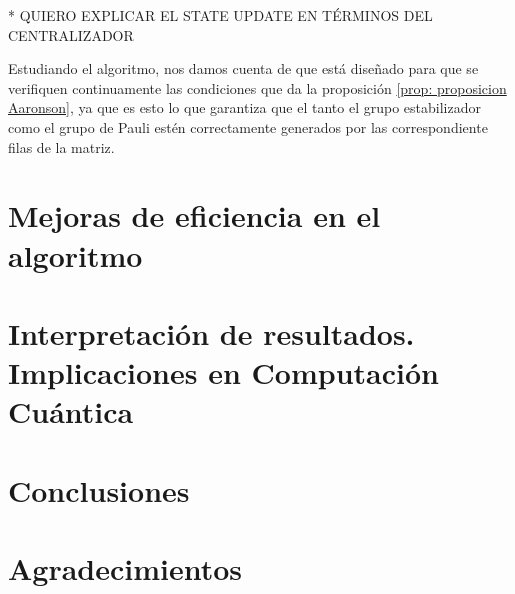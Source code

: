\documentclass[11pt,a4paper,twoside,pdf]{article}
\numberwithin{equation}{section}
\begin{document}
		* QUIERO EXPLICAR EL STATE UPDATE EN TÉRMINOS DEL CENTRALIZADOR
		
		Estudiando el algoritmo, nos damos cuenta de que está diseñado para que se verifiquen continuamente las condiciones que da la proposición \ref{prop: proposicion Aaronson}, ya que es esto lo que garantiza que el tanto el grupo estabilizador como el grupo de Pauli estén correctamente generados por las correspondiente filas de la matriz.
		
\section{Mejoras de eficiencia en el algoritmo}

\section{Interpretación de resultados. Implicaciones en Computación Cuántica}

\section{Conclusiones}

\section{Agradecimientos}	

		



\newpage

\end{document}

